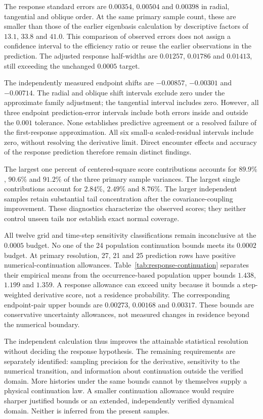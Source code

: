 \documentclass[aps,prd,reprint,amsmath,amssymb,superscriptaddress,nofootinbib,longbibliography,floatfix]{revtex4-2}
\begin{document}
The response standard errors are $0.00354$, $0.00504$ and $0.00398$ in radial, tangential and oblique order. At the same primary sample count, these are smaller than those of the earlier eigenbasis calculation by descriptive factors of $13.1$, $33.8$ and $41.0$. This comparison of observed errors does not assign a confidence interval to the efficiency ratio or reuse the earlier observations in the prediction. The adjusted response half-widths are $0.01257$, $0.01786$ and $0.01413$, still exceeding the unchanged $0.0005$ target.

The independently measured endpoint shifts are $-0.00857$, $-0.00301$ and $-0.00714$. The radial and oblique shift intervals exclude zero under the approximate family adjustment; the tangential interval includes zero. However, all three endpoint prediction-error intervals include both errors inside and outside the $0.001$ tolerance. None establishes predictive agreement or a resolved failure of the first-response approximation. All six small-$a$ scaled-residual intervals include zero, without resolving the derivative limit. Direct encounter effects and accuracy of the response prediction therefore remain distinct findings.

The largest one percent of centered-square score contributions accounts for $89.9\%$, $90.6\%$ and $91.2\%$ of the three primary sample variances. The largest single contributions account for $2.84\%$, $2.49\%$ and $8.76\%$. The larger independent samples retain substantial tail concentration after the covariance-coupling improvement. These diagnostics characterize the observed scores; they neither control unseen tails nor establish exact normal coverage.


All twelve grid and time-step sensitivity classifications remain inconclusive at the $0.0005$ budget. No one of the 24 population continuation bounds meets its $0.0002$ budget. At primary resolution, 27, 21 and 25 prediction rows have positive numerical-continuation allowances. Table~\ref{tab:response-continuation} separates their empirical means from the occurrence-based population upper bounds $1.438$, $1.199$ and $1.359$. A response allowance can exceed unity because it bounds a step-weighted derivative score, not a residence probability. The corresponding endpoint-pair upper bounds are $0.00273$, $0.00168$ and $0.00317$. These bounds are conservative uncertainty allowances, not measured changes in residence beyond the numerical boundary.

The independent calculation thus improves the attainable statistical resolution without deciding the response hypothesis. The remaining requirements are separately identified: sampling precision for the derivative, sensitivity to the numerical transition, and information about continuation outside the verified domain. More histories under the same bounds cannot by themselves supply a physical continuation law. A smaller continuation allowance would require sharper justified bounds or an extended, independently verified dynamical domain. Neither is inferred from the present samples.
\end{document}

